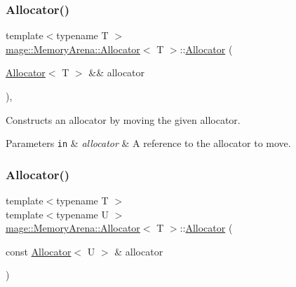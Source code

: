 \subsubsection{\texorpdfstring{Allocator()}{Allocator()}\hspace{0.1cm}{\footnotesize\ttfamily [2/4]}}
{\footnotesize\ttfamily template$<$typename T $>$ \\
\mbox{\hyperlink{classmage_1_1_memory_arena_1_1_allocator}{mage\+::\+Memory\+Arena\+::\+Allocator}}$<$ T $>$\+::\mbox{\hyperlink{classmage_1_1_memory_arena_1_1_allocator}{Allocator}} (\begin{DoxyParamCaption}\item[{\mbox{\hyperlink{classmage_1_1_memory_arena_1_1_allocator}{Allocator}}$<$ T $>$ \&\&}]{allocator }\end{DoxyParamCaption})\hspace{0.3cm}{\ttfamily [default]}, {\ttfamily [noexcept]}}

Constructs an allocator by moving the given allocator.


\begin{DoxyParams}[1]{Parameters}
\mbox{\tt in}  & {\em allocator} & A reference to the allocator to move. \\
\hline
\end{DoxyParams}
\mbox{\label{classmage_1_1_memory_arena_1_1_allocator_a412318dd063697fc4a2238c131b5e0e9}} 
\subsubsection{\texorpdfstring{Allocator()}{Allocator()}\hspace{0.1cm}{\footnotesize\ttfamily [3/4]}}
{\footnotesize\ttfamily template$<$typename T $>$ \\
template$<$typename U $>$ \\
\mbox{\hyperlink{classmage_1_1_memory_arena_1_1_allocator}{mage\+::\+Memory\+Arena\+::\+Allocator}}$<$ T $>$\+::\mbox{\hyperlink{classmage_1_1_memory_arena_1_1_allocator}{Allocator}} (\begin{DoxyParamCaption}\item[{const \mbox{\hyperlink{classmage_1_1_memory_arena_1_1_allocator}{Allocator}}$<$ U $>$ \&}]{allocator }\end{DoxyParamCaption})\hspace{0.3cm}{\ttfamily [noexcept]}}

